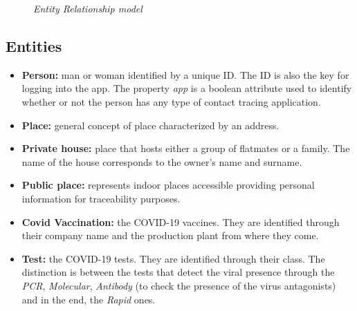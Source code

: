\begin{figure}[h]
    \noindent{}
\caption{\textit{Entity Relationship model}}
\end{figure}

\subsection{Entities}
\begin{itemize}
    \item \textbf{Person:} man or woman identified by a unique ID. The ID is also the key for logging into the app. The property \textit{app} is a boolean attribute used to identify whether or not the person has any type of contact tracing application.
    \item \textbf{Place:} general concept of place characterized by an address.
    \item \textbf{Private house:} place that hosts either a group of flatmates or a family. The name of the house corresponds to the owner's name and surname. 
    \item \textbf{Public place:} represents indoor places accessible providing personal information for traceability purposes.
    \item \textbf{Covid Vaccination:} the COVID-19 vaccines. 
    They are identified through their company name and the production plant from where they come.
    \item \textbf{Test:} the COVID-19 tests. They are identified through their class. The distinction is between the tests that detect the viral presence through the \textit{PCR}, \textit{Molecular}, \textit{Antibody} (to check the presence of the virus antagonists) and in the end, the \textit{Rapid} ones. 
\end{itemize}

